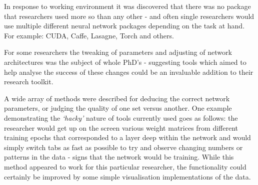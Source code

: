 \documentclass[a4paper,11pt,titlepage]{article}
\begin{document}
	\begin{figure}[H]
	\end{figure}
	
	In response to working environment it was discovered that there was no package that researchers used more so than any other - and often single researchers would use multiple different neural network packages depending on the task at hand. For example: CUDA, Caffe, Lasagne, Torch and others. 
	\par 
	
	\begin{figure}[H]
	\end{figure}
	
	For some researchers the tweaking of parameters and adjusting of network architectures was the subject of whole PhD's - suggesting tools which aimed to help analyse the success of these changes could be an invaluable addition to their research toolkit. 
	\par 
	A wide array of methods were described for deducing the correct network parameters, or judging the quality of one set versus another. One example demonstrating the \textit{`hacky'} nature of tools currently used goes as follows: the researcher would get up on the screen various weight matrices from different training epochs that corresponded to a layer deep within the network and would simply switch tabs as fast as possible to try and observe changing numbers or patterns in the data - signs that the network would be training. While this method appeared to work for this particular researcher, the functionality could certainly be improved by some simple visualisation implementations of the data.
	\par 
	
\end{document}
